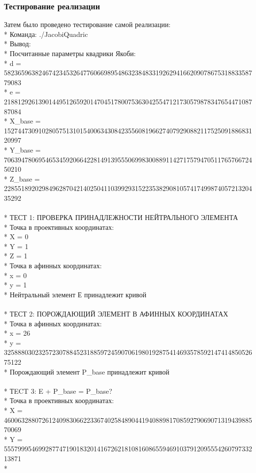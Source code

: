 \documentclass[12pt]{article}
\begin{document}
\subsubsection{Тестирование реализации}
Затем было проведено тестирование самой реализации:\\*
Команда: ./JacobiQuadric\\*
Вывод:\\*
Посчитанные параметры квадрики Якоби:\\*
d = 58236596382467423453264776066989548632384833192629416620907867531883358779083\\*
e = 21881292613901449512659201470451780075363042554712173057987834765447108787084\\*
X\_base = 15274473091028057513101540063430842355608196627407929088211752509188683120997\\*
Y\_base = 70639478069546534592066422814913955506998300889114271757947051176576672450210\\*
Z\_base = 22855189202984962870421402504110399293152235382908105741749987405721320435292\\
\\*
ТЕСТ 1: ПРОВЕРКА ПРИНАДЛЕЖНОСТИ НЕЙТРАЛЬНОГО ЭЛЕМЕНТА\\*
Точка в проективных координатах:\\*
X = 0\\*
Y = 1\\*
Z = 1\\*
Точка в афинных координатах:\\*
x = 0\\*
y = 1\\*
Нейтральный элемент Е принадлежит кривой\\
\\*
ТЕСТ 2: ПОРОЖДАЮЩИЙ ЭЛЕМЕНТ В АФИННЫХ КООРДИНАТАХ\\*
Точка в афинных координатах:\\*
x = 26\\*
y = 32588803023257230788452318859724590706198019287541469357859214741485052675122\\*
Порождающий элемент P\_base принадлежит кривой\\
\\*
ТECT 3: E + P\_base = P\_base?\\*
Точка в проективных координатах:\\*
X = 46006328807261240983066223367402584890441940889817085927906907131943988570069\\*
Y = 55579995469928774719018320141672621810816086559469103791209555426079733213871\\*
\end{document}
